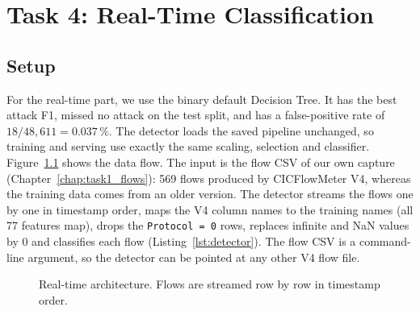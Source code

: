 \chapter{Task 4: Real-Time Classification}\label{chap:task4_realtime}

\section{Setup}\label{sec:realtime-setup}

For the real-time part, we use the binary default Decision Tree. It has the best attack F1, missed no attack on the test split, and has a false-positive rate of $18 / 48{,}611 = 0.037\,\%$. The detector loads the saved pipeline unchanged, so training and serving use exactly the same scaling, selection and classifier. Figure~\ref{fig:arch} shows the data flow. The input is the flow CSV of our own capture (Chapter~\ref{chap:task1_flows}): 569 flows produced by CICFlowMeter V4, whereas the training data comes from an older version. The detector streams the flows one by one in timestamp order, maps the V4 column names to the training names (all 77 features map), drops the \texttt{Protocol = 0} rows, replaces infinite and NaN values by 0 and classifies each flow (Listing~\ref{lst:detector}). The flow CSV is a command-line argument, so the detector can be pointed at any other V4 flow file.

\begin{figure}[ht]
	\centering
	\caption{Real-time architecture. Flows are streamed row by row in timestamp order.}
	\label{fig:arch}
\end{figure}

